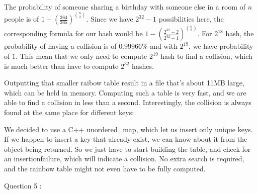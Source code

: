 \documentclass[4apaper]{report}
\begin{document}
The probability of someone sharing a birthday with someone else in a room of $n$ people is of $1 - (\frac {364}{365})^{\binom {n}{2}}$. Since we have $2^{32}-1$ possibilities here, the corresponding formula for our hash would be  $1 - (\frac {2^{32}-2}{2^{32}-1})^{\binom {n}{2}}$. For $2^{18}$ hash, the probability of having a collision is of $0.99966\%$ and with $2^{19}$, we have probability of $1$. This mean that we only need to compute $2^19$ hash to find a collision, which is much better than have to compute $2^{32}$ hashes.

Outputting that smaller raibow table result in a file that's about 11MB large, which can be held in memory. Computing such a table is very fast, and we are able to find a collision in less than a second. Interestingly, the collision is always found at the same place for different keys:

We decided to use a C++ unordered_map, which let us insert only unique keys. If we happen to insert a key that already exist, we can know about it from the object being returned. So we just have to start building the table, and check for an insertionfailure, which will indicate a collision. No extra search is required, and the rainbow table might not even have to be fully computed.

Question 5 :
\end{document}
